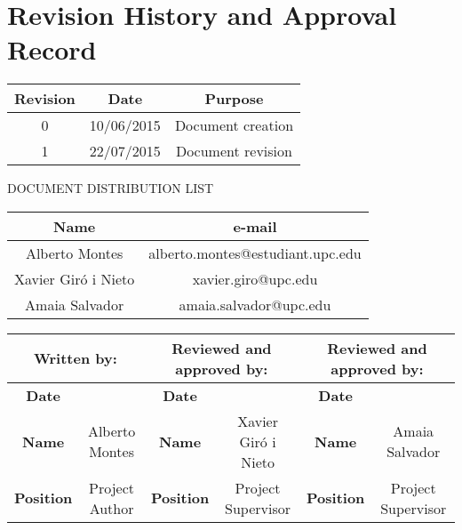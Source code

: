 \chapter*{Revision History and Approval Record}

\begin{table}[h]
\centering
\begin{tabular}{| c| c | c |} 
\hline
\textbf{Revision} & \textbf{Date} & \textbf{Purpose}\\ [0.5ex]
\hline
0 &  10/06/2015 &  Document creation\\ [0.5ex]
\hline
1 &  22/07/2015 &  Document revision\\ [0.5ex]
\hline
\end{tabular}
\end{table}

\vspace{2cm}

DOCUMENT DISTRIBUTION LIST

\begin{table}[h]
\centering
\begin{tabular}{| c| c|} 
\hline
\textbf{Name} & \textbf{e-mail} \\ [0.5ex]
\hline
Alberto Montes & alberto.montes@estudiant.upc.edu\\ [0.5ex]
\hline
Xavier Giró i Nieto &  xavier.giro@upc.edu\\ [0.5ex]
\hline
Amaia Salvador &  amaia.salvador@upc.edu\\ [0.5ex]
\hline
\end{tabular}
\end{table}

\vspace{2cm}

\begin{table}[h]
\centering
\begin{tabular}{| c| c| c| c| c| c|} 
\hline
\multicolumn{2}{|c|}{\textbf{Written by:}} & \multicolumn{2}{|c|}{\textbf{Reviewed and approved by:}} & \multicolumn{2}{|c|}{\textbf{Reviewed and approved by:}} \\ [0.5ex]
\hline
\textbf{Date} &  & \textbf{Date} &  & \textbf{Date} &  \\ [0.5ex]
\hline
\textbf{Name} & Alberto Montes & \textbf{Name} & Xavier Giró i Nieto & \textbf{Name} & Amaia Salvador \\ [0.5ex]
\hline
\textbf{Position} & Project Author & \textbf{Position} & Project Supervisor & \textbf{Position} & Project Supervisor \\ [0.5ex]
\hline
\end{tabular}
\end{table}
